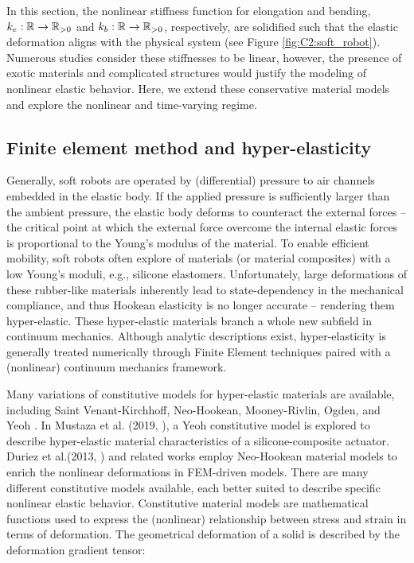 \noindent In this section, the nonlinear stiffness function for elongation and bending, $k_e: \mathbb{R} \to \mathbb{R}_{>0}$ and $k_b: \mathbb{R} \to \mathbb{R}_{>0}$, respectively, are solidified such that the elastic deformation aligns with the physical system (see Figure \ref{fig:C2:soft_robot}). Numerous studies consider these stiffnesses to be linear, however, the presence of exotic materials and complicated structures would justify the modeling of nonlinear elastic behavior. Here, we extend these conservative material models and explore the nonlinear and time-varying regime.

\subsection{Finite element method and hyper-elasticity}
Generally, soft robots are operated by (differential) pressure to air channels embedded in the elastic body. If the applied pressure is sufficiently larger than the ambient pressure, the elastic body deforms to counteract the external forces -- the critical point at which the external force overcome the internal elastic forces is proportional to the Young's modulus of the material.
To enable efficient mobility, soft robots often explore of materials (or material composites) with a low Young's moduli, e.g., silicone elastomers. Unfortunately, large deformations of these rubber-like materials inherently lead to state-dependency in the mechanical compliance, and thus Hookean elasticity is no longer accurate -- rendering them hyper-elastic. These hyper-elastic materials branch a whole new subfield in continuum mechanics. Although analytic descriptions exist, hyper-elasticity is generally treated numerically through Finite Element techniques \cite{Duriez2013,Largilliere2015,Coevoet2017} paired with a (nonlinear) continuum mechanics framework.

Many variations of constitutive models for hyper-elastic materials are available, including Saint Venant-Kirchhoff, Neo-Hookean, Mooney-Rivlin, Ogden, and Yeoh \cite{Meyer2009,Renaud2011,Kim2018}. In Mustaza et al. (2019, \cite{Mustaza2019}), a Yeoh constitutive model is explored to describe hyper-elastic material characteristics of a silicone-composite actuator. Duriez et al.(2013, \cite{Duriez2013}) and related works \cite{Coevoet2017,Largilliere2015} employ Neo-Hookean material models to enrich the nonlinear deformations in FEM-driven models. There are many different constitutive models available, each better suited to describe specific nonlinear elastic behavior. Constitutive material models are mathematical functions used to express the (nonlinear) relationship between stress and strain in terms of deformation. The geometrical deformation of a solid is described by the deformation gradient tensor: \vspace{-3mm}

